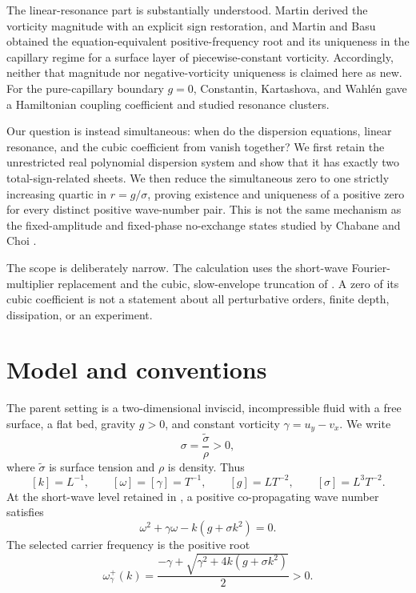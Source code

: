 \documentclass[11pt]{article}
\theoremstyle{remark}
\begin{document}
The linear-resonance part is substantially understood. Martin
\cite{Martin2017} derived the vorticity magnitude with an explicit sign
restoration, and Martin and Basu \cite{MartinBasu2021} obtained the
equation-equivalent positive-frequency root and its uniqueness in the
capillary regime for a surface layer of piecewise-constant vorticity.
Accordingly, neither that magnitude nor negative-vorticity uniqueness is
claimed here as new. For the pure-capillary boundary \(g=0\), Constantin,
Kartashova, and Wahl{\'e}n \cite{ConstantinKartashovaWahlen2010} gave a
Hamiltonian coupling coefficient and studied resonance clusters.

Our question is instead simultaneous: when do the dispersion equations,
linear resonance, and the cubic coefficient from
\cite{IvanovMartin2019} vanish together? We first retain the unrestricted
real polynomial dispersion system and show that it has exactly two
total-sign-related sheets. We then reduce the simultaneous zero to one
strictly increasing quartic in \(r=g/\sigma\), proving existence and
uniqueness of a positive zero for every distinct positive wave-number pair.
This is not the same mechanism as the fixed-amplitude and fixed-phase
no-exchange states studied by Chabane and Choi \cite{ChabaneChoi2019}.

The scope is deliberately narrow. The calculation uses the short-wave
Fourier-multiplier replacement and the cubic, slow-envelope truncation of
\cite{IvanovMartin2019}. A zero of its cubic coefficient is not a statement
about all perturbative orders, finite depth, dissipation, or an experiment.

\section{Model and conventions}

The parent setting is a two-dimensional inviscid, incompressible fluid with a
free surface, a flat bed, gravity \(g>0\), and constant vorticity
\(\gamma=u_y-v_x\). We write
\[
  \sigma=\frac{\widetilde{\sigma}}{\rho}>0,
\]
where \(\widetilde{\sigma}\) is surface tension and \(\rho\) is density.
Thus
\[
 [k]=L^{-1},\qquad [\omega]=[\gamma]=T^{-1},\qquad
 [g]=LT^{-2},\qquad [\sigma]=L^3T^{-2}.
\]
At the short-wave level retained in \cite{IvanovMartin2019}, a positive
co-propagating wave number satisfies
\begin{equation}
  \omega^2+\gamma\omega-k(g+\sigma k^2)=0.       \label{eq:dispersion}
\end{equation}
The selected carrier frequency is the positive root
\begin{equation}
  \omega^+_\gamma(k)
  =\frac{-\gamma+\sqrt{\gamma^2+4k(g+\sigma k^2)}}{2}>0. \label{eq:positive}
\end{equation}
\end{document}
